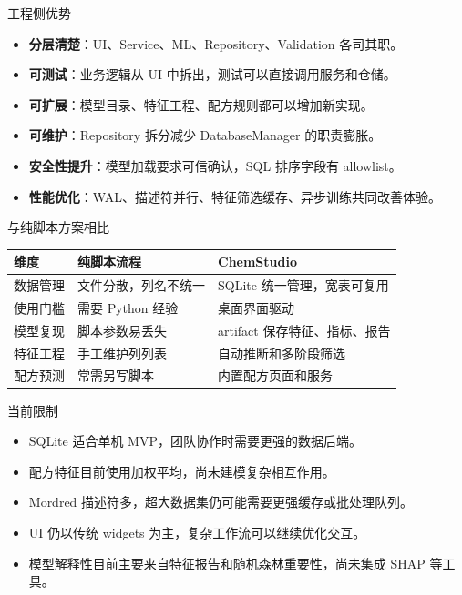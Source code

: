 \documentclass[aspectratio=169,11pt]{beamer}
\newcommand{\kw}[1]{\textcolor{ChemBlue}{\textbf{#1}}}
\begin{document}
\begin{frame}{工程侧优势}
  \begin{itemize}
    \item \kw{分层清楚}：UI、Service、ML、Repository、Validation 各司其职。
    \item \kw{可测试}：业务逻辑从 UI 中拆出，测试可以直接调用服务和仓储。
    \item \kw{可扩展}：模型目录、特征工程、配方规则都可以增加新实现。
    \item \kw{可维护}：Repository 拆分减少 DatabaseManager 的职责膨胀。
    \item \kw{安全性提升}：模型加载要求可信确认，SQL 排序字段有 allowlist。
    \item \kw{性能优化}：WAL、描述符并行、特征筛选缓存、异步训练共同改善体验。
  \end{itemize}
\end{frame}

\begin{frame}{与纯脚本方案相比}
  \begin{table}
    \small
    \begin{tabularx}{\textwidth}{p{}X X}
      \toprule
      维度 & 纯脚本流程 & ChemStudio \\
      \midrule
      数据管理 & 文件分散，列名不统一 & SQLite 统一管理，宽表可复用 \\
      使用门槛 & 需要 Python 经验 & 桌面界面驱动 \\
      模型复现 & 脚本参数易丢失 & artifact 保存特征、指标、报告 \\
      特征工程 & 手工维护列列表 & 自动推断和多阶段筛选 \\
      配方预测 & 常需另写脚本 & 内置配方页面和服务 \\
      \bottomrule
    \end{tabularx}
  \end{table}
\end{frame}

\begin{frame}{当前限制}
  \begin{itemize}
    \item SQLite 适合单机 MVP，团队协作时需要更强的数据后端。
    \item 配方特征目前使用加权平均，尚未建模复杂相互作用。
    \item Mordred 描述符多，超大数据集仍可能需要更强缓存或批处理队列。
    \item UI 仍以传统 widgets 为主，复杂工作流可以继续优化交互。
    \item 模型解释性目前主要来自特征报告和随机森林重要性，尚未集成 SHAP 等工具。
  \end{itemize}
\end{frame}
\end{document}
